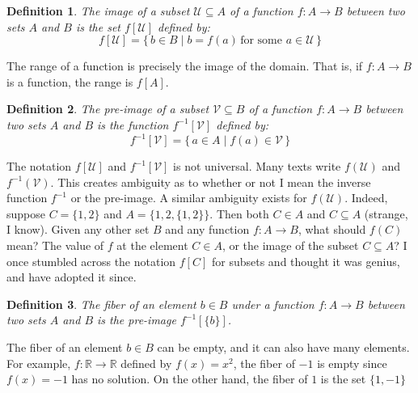 \documentclass{article}
\theoremstyle{plain}
\theoremstyle{normal}
\newtheorem{definition}{Definition}[section]
\begin{document}
        \begin{definition}
            The image of a subset $\mathcal{U}\subseteq{A}$ of a function
            $f:A\rightarrow{B}$ between two sets $A$ and $B$ is the set
            $f[\mathcal{U}]$ defined by:
            \begin{equation}
                f[\mathcal{U}]=\{\,b\in{B}\;|\;
                    b=f(a)\,\textrm{for some }a\in\mathcal{U}\,\}
            \end{equation}
        \end{definition}
        The range of a function is precisely the image of the domain. That is,
        if $f:A\rightarrow{B}$ is a function, the range is $f[A]$.
        \begin{definition}
            The pre-image of a subset $\mathcal{V}\subseteq{B}$ of a function
            $f:A\rightarrow{B}$ between two sets $A$ and $B$ is the function
            $f^{-1}[\mathcal{V}]$ defined by:
            \begin{equation}
                f^{-1}[\mathcal{V}]=\{\,a\in{A}\;|\;
                    f(a)\in\mathcal{V}\,\}
            \end{equation}
        \end{definition}
        The notation $f[\mathcal{U}]$ and $f^{-1}[\mathcal{V}]$ is not
        universal. Many texts write $f(\mathcal{U})$ and
        $f^{-1}(\mathcal{V})$. This creates ambiguity as to whether or not I
        mean the inverse function $f^{-1}$ or the pre-image. A similar
        ambiguity exists for $f(\mathcal{U})$. Indeed, suppose
        $C=\{1,2\}$ and $A=\{1,2,\{1,2\}\}$. Then both $C\in{A}$ and
        $C\subseteq{A}$ (strange, I know). Given any other set $B$ and any
        function $f:A\rightarrow{B}$, what should $f(C)$ mean? The value of
        $f$ at the element $C\in{A}$, or the image of the subset
        $C\subseteq{A}$? I once stumbled across the notation
        $f[C]$ for subsets and thought it was genius, and have adopted it
        since.
        \begin{definition}
            The fiber of an element $b\in{B}$ under a function
            $f:A\rightarrow{B}$ between two sets $A$ and $B$ is the pre-image
            $f^{-1}[\{b\}]$.
        \end{definition}
        The fiber of an element $b\in{B}$ can be empty, and it can also have
        many elements. For example, $f:\mathbb{R}\rightarrow\mathbb{R}$ defined
        by $f(x)=x^2$, the fiber of $-1$ is empty since $f(x)=-1$ has no
        solution. On the other hand, the fiber of $1$ is the set $\{1,-1\}$
\end{document}
